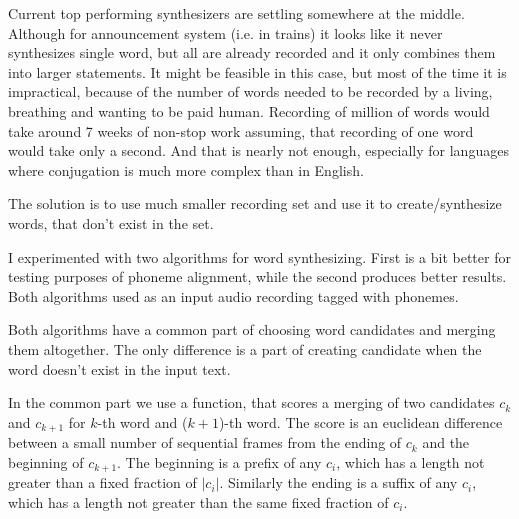 \documentclass[12pt,a4paper,english]{article}
\begin{document}
Current top performing synthesizers are settling somewhere at the middle. Although for announcement system (i.e. in trains) it looks like it never synthesizes single word, but all are already recorded and it only combines them into larger statements. It might be feasible in this case, but most of the time it is impractical, because of the number of words needed to be recorded by a living, breathing and wanting to be paid human. Recording of million of words would take around 7 weeks of non-stop work assuming, that recording of one word would take only a second. And that is nearly not enough, especially for languages where conjugation is much more complex than in English. \newline

The solution is to use much smaller recording set and use it to create/synthesize words, that don't exist in the set. \newline

I experimented with two algorithms for word synthesizing. First is a bit better for testing purposes of phoneme alignment, while the second produces better results. Both algorithms used as an input audio recording tagged with phonemes. \newline


Both algorithms have a common part of choosing word candidates and merging them altogether. The only difference is a part of creating candidate when the word doesn't exist in the input text. \newline

In the common part we use a function, that scores a merging of two candidates $c_k$ and $c_{k+1}$ for $k$-th word and ($k+1$)-th word. \newline
The score is an euclidean difference between a small number of sequential frames from the ending of $c_k$ and the beginning of $c_{k+1}$. \newline
The beginning is a prefix of any $c_i$, which has a length not greater than a fixed fraction of $|c_i|$. \newline
Similarly the ending is a suffix of any $c_i$, which has a length not greater than the same fixed fraction of $c_i$. 

\newpage
\end{document}
